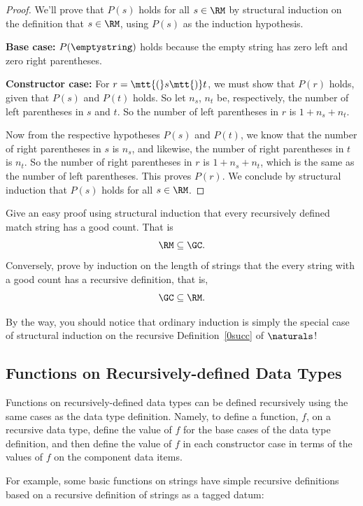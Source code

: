 \begin{definition}
\begin{proof}
  We'll prove that $P(s)$ holds for all $s \in\RM$ by structural induction
  on the definition that $s \in\RM$, using $P(s)$ as the induction
  hypothesis.

\textbf{Base case:} $P(\emptystring)$ holds because the empty string has zero
left and zero right parentheses.

\textbf{Constructor case:} For $r = \mtt{(}s\mtt{)}t$, we must show
that $P(r)$ holds, given that $P(s)$ and $P(t)$ holds.  So let $n_s$,
$n_t$ be, respectively, the number of left parentheses in $s$ and $t$.  So
the number of left parentheses in $r$ is $1+n_s+n_t$.

Now from the respective hypotheses $P(s)$ and $P(t)$, we know that the
number of right parentheses in $s$ is $n_s$, and likewise, the number of
right parentheses in $t$ is $n_t$.  So the number of right parentheses in
$r$ is $1+n_s+n_t$, which is the same as the number of left parentheses.
This proves $P(r)$.  We conclude by structural induction that $P(s)$ holds
for all $s \in\RM$.
\end{proof}

\begin{notesproblem}
\bparts
\ppart Give an easy proof using structural induction that every recursively
defined match string has a good count.  That is
\[
\RM \subseteq \GC.
\]
\ppart Conversely, prove by induction on the length of strings that the
every string with a good count has a recursive definition, that is,
\[
\GC \subseteq \RM.
\]

\eparts
\end{notesproblem}

By the way, you should notice that ordinary induction is simply the
special case of structural induction on the recursive
Definition~\ref{0succ} of $\naturals$!

\subsection{Functions on Recursively-defined Data Types}

Functions on recursively-defined data types can be defined recursively
using the same cases as the data type definition.  Namely, to define a
function, $f$, on a recursive data type, define the value of $f$ for the
base cases of the data type definition, and then define the value of $f$
in each constructor case in terms of the values of $f$ on the component
data items.

\iffalse

For example, some basic functions on strings have simple recursive
definitions based on a recursive definition of strings as a tagged datum:


\end{definition}
